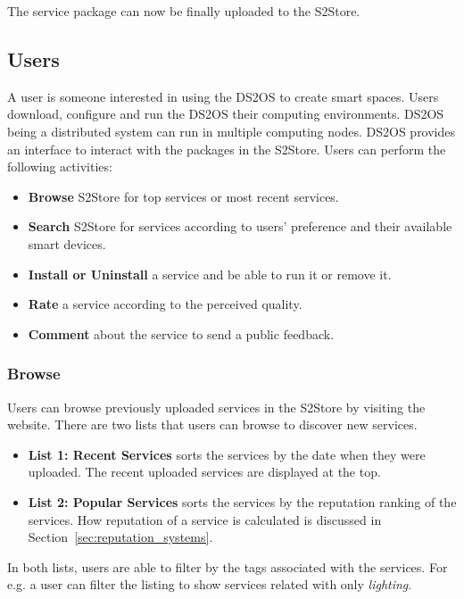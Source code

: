 The service package can now be finally uploaded to the S2Store.

\subsection{Users}

A user is someone interested in using the DS2OS to create smart spaces. Users download, configure and run the DS2OS their computing environments. DS2OS being a distributed system can run in multiple computing nodes. DS2OS provides an interface to interact with the packages in the S2Store. Users can perform the following activities:

\begin{itemize}
  \item \textbf{Browse} S2Store for top services or most recent services.
  \item \textbf{Search} S2Store for services according to users' preference and their available smart devices.
  \item \textbf{Install or Uninstall} a service and be able to run it or remove it.
  \item \textbf{Rate} a service according to the perceived quality.
  \item \textbf{Comment} about the service to send a public feedback.
\end{itemize}

\subsubsection{Browse}

Users can browse previously uploaded services in the S2Store by visiting the website. There are two lists that users can browse to discover new services.

\begin{itemize}
  \item \textbf{List 1: Recent Services} sorts the services by the date when they were uploaded. The recent uploaded services are displayed at the top.
  \item \textbf{List 2: Popular Services} sorts the services by the reputation ranking of the services. How reputation of a service is calculated is discussed in Section~\ref{sec:reputation_systems}.
\end{itemize}

In both lists, users are able to filter by the tags associated with the services. For e.g. a user can filter the listing to show services related with only \emph{lighting}.

